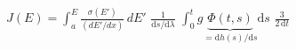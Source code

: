 \documentclass{article}
\begin{document}
$J(E)=\int_{a}^{E}\frac{\sigma(E')}{\left(dE'/dx\right)}\,dE'$
$\frac{1}{\mathrm{d}s/\mathrm{d}\lambda}$
$\int_0^t g\underbrace{\Phi(t,s)}_{=\mathrm{d}h(s)/\mathrm{d}s}\mathrm{d}s$
$\frac{3}{2\,\mathrm{d}t}$
\end{document}

